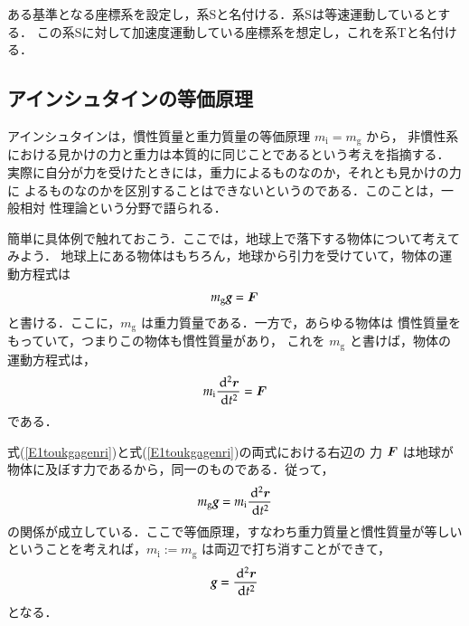                 ある基準となる座標系を設定し，系Sと名付ける．系Sは等速運動しているとする．
                この系Sに対して加速度運動している座標系を想定し，これを系Tと名付ける．


\subsection{アインシュタインの等価原理}
                アインシュタインは，慣性質量と重力質量の等価原理 $m_{\mathrm{i}}=m_{\mathrm{g}}$ から，
                非慣性系における見かけの力と重力は本質的に同じことであるという考えを指摘する．
                実際に自分が力を受けたときには，重力によるものなのか，それとも見かけの力に
                よるものなのかを区別することはできないというのである．このことは，一般相対
                性理論という分野で語られる．

                簡単に具体例で触れておこう．ここでは，地球上で落下する物体について考えてみよう．
                地球上にある物体はもちろん，地球から引力を受けていて，物体の運動方程式は
                    \begin{align}\label{E1toukgagenri}
                        m_{\mathrm{g}}\textit{\textbf{g}}=\bF
                    \end{align}
                と書ける．ここに，$m_{\mathrm{g}}$ は重力質量である．一方で，あらゆる物体は
                慣性質量をもっていて，つまりこの物体も慣性質量があり，
                これを $m_{\mathrm{g}}$ と書けば，物体の運動方程式は，
                    \begin{align}\label{E2toukgagenri}
                        m_{\mathrm{i}}\frac{\df^{2} \br}{\df t^{2}}=\bF
                    \end{align}
                である．

                式(\ref{E1toukgagenri})と式(\ref{E1toukgagenri})の両式における右辺の
                力 $\boldsymbol{F}$ は地球が物体に及ぼす力であるから，同一のものである．従って，
                    \begin{align}\label{E1}
                        m_{\mathrm{g}}\textit{\textbf{g}}=m_{\mathrm{i}}\frac{\df^{2} \br}{\df t^{2}}
                    \end{align}
                の関係が成立している．ここで等価原理，すなわち重力質量と慣性質量が等しい
                ということを考えれば，$m_{\mathrm{i}} := m_{\mathrm{g}}$ は両辺で打ち消すことができて，
                    \begin{align}\label{E2}
                        \textit{\textbf{g}}=\frac{\df^{2} \br}{\df t^{2}}
                    \end{align}
                となる．

